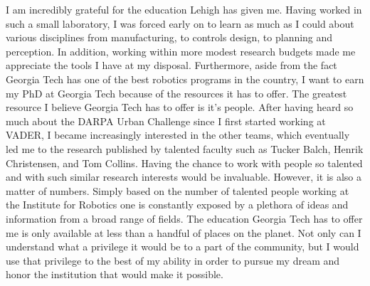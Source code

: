 \documentclass[12pt]{article}
\begin{document}
I am incredibly grateful for the education Lehigh has given me. Having worked
in such a small laboratory, I was forced early on to learn as much as I could
about various disciplines from manufacturing, to controls design, to planning
and perception. In addition, working within more modest research budgets made
me appreciate the tools I have at my disposal. Furthermore, aside from the fact
Georgia Tech has one of the best robotics programs in the country, I want to
earn my PhD at Georgia Tech because of the resources it has to offer. The
greatest resource I believe Georgia Tech has to offer is it's people. After
having heard so much about the DARPA Urban Challenge since I first started
working at VADER, I became increasingly interested in the other teams, which
eventually led me to the research published by talented faculty such as Tucker
Balch, Henrik Christensen, and Tom Collins. Having the chance to work with
people so talented and with such similar research interests would be
invaluable.  However, it is also a matter of numbers. Simply based on the
number of talented people working at the Institute for Robotics one is
constantly exposed by a plethora of ideas and information from a broad range of
fields. The education Georgia Tech has to offer me is only available at less
than a handful of places on the planet. Not only can I understand what a
privilege it would be to a part of the community, but I would use that
privilege to the best of my ability in order to pursue my dream and honor the
institution that would make it possible.
\end{document}
